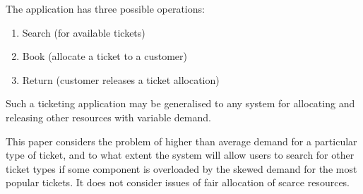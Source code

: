 \documentclass[runningheads]{llncs}
\begin{document}
The application has three possible operations:
\begin{enumerate}
\item Search (for available tickets)
\item Book (allocate a ticket to a customer)
\item Return (customer releases a ticket allocation)
\end{enumerate}

Such a ticketing application may be generalised to any system for allocating and releasing other resources with variable demand.

This paper considers the problem of higher than average demand for a particular type of ticket, and to what extent the system will allow users to search for other ticket types if some component is overloaded by the skewed demand for the most popular tickets.  It does not consider issues of fair allocation of scarce resources.

%
%



%
%



%
%



%
%



%
%



%
%



%
%



\end{document}
